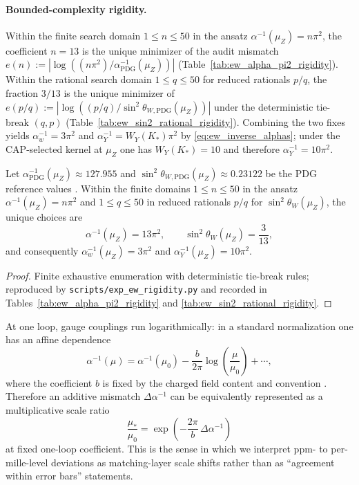 \paragraph{Bounded-complexity rigidity.}
Within the finite search domain $1\le n\le 50$ in the ansatz $\alpha^{-1}(\mu_Z)=n\pi^2$, the coefficient $n=13$ is the unique minimizer of the audit mismatch $e(n):=|\log((n\pi^2)/\alpha^{-1}_{\mathrm{PDG}}(\mu_Z))|$ (Table~\ref{tab:ew_alpha_pi2_rigidity}).
Within the rational search domain $1\le q\le 50$ for reduced rationals $p/q$, the fraction $3/13$ is the unique minimizer of $e(p/q):=|\log((p/q)/\sin^2\theta_{W,\mathrm{PDG}}(\mu_Z))|$ under the deterministic tie-break $(q,p)$ (Table~\ref{tab:ew_sin2_rational_rigidity}).
Combining the two fixes yields $\alpha_w^{-1}=3\pi^2$ and $\alpha_Y^{-1}=W_Y(K_\ast)\pi^2$ by \eqref{eq:ew_inverse_alphas}; under the CAP-selected kernel at $\mu_Z$ one has $W_Y(K_\ast)=10$ and therefore $\alpha_Y^{-1}=10\pi^2$.
\begin{proposition}\label{prop:ew_rigidity}
Let $\alpha^{-1}_{\mathrm{PDG}}(\mu_Z)\approx 127.955$ and $\sin^2\theta_{W,\mathrm{PDG}}(\mu_Z)\approx 0.23122$ be the PDG reference values \cite{PDGRPP2024}.
Within the finite domains $1\le n\le 50$ in the ansatz $\alpha^{-1}(\mu_Z)=n\pi^2$ and $1\le q\le 50$ in reduced rationals $p/q$ for $\sin^2\theta_W(\mu_Z)$, the unique choices are
\[
\alpha^{-1}(\mu_Z)=13\pi^2,\qquad \sin^2\theta_W(\mu_Z)=\frac{3}{13},
\]
and consequently $\alpha_w^{-1}(\mu_Z)=3\pi^2$ and $\alpha_Y^{-1}(\mu_Z)=10\pi^2$.
\end{proposition}
\begin{proof}
Finite exhaustive enumeration with deterministic tie-break rules; reproduced by \texttt{scripts/exp\_ew\_rigidity.py} and recorded in Tables~\ref{tab:ew_alpha_pi2_rigidity} and \ref{tab:ew_sin2_rational_rigidity}.
\end{proof}

\begin{remark}\label{rem:qed_running_scale_shift}
At one loop, gauge couplings run logarithmically: in a standard normalization one has an affine dependence
\[
\alpha^{-1}(\mu)=\alpha^{-1}(\mu_0)-\frac{b}{2\pi}\log\!\left(\frac{\mu}{\mu_0}\right)+\cdots,
\]
where the coefficient $b$ is fixed by the charged field content and convention \cite{PeskinSchroeder1995,WeinbergQFT1995}.
Therefore an additive mismatch $\Delta\alpha^{-1}$ can be equivalently represented as a multiplicative scale ratio
\[
\frac{\mu_\ast}{\mu_0}=\exp\!\left(-\frac{2\pi}{b}\,\Delta\alpha^{-1}\right)
\]
at fixed one-loop coefficient.
This is the sense in which we interpret ppm- to per-mille-level deviations as matching-layer scale shifts rather than as ``agreement within error bars'' statements.
\end{remark}

